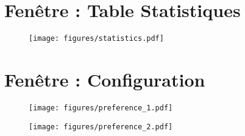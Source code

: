 \begin{appendices}
\section{Fenêtre : Table Statistiques}

\begin{figure}[ht]
	\centering \texttt{[image: figures/statistics.pdf]}
\end{figure}
\clearpage


\section{Fenêtre : Configuration}

\begin{figure}[ht]
	\centering \texttt{[image: figures/preference\_1.pdf]}
\end{figure}
\begin{figure}[ht]
	\centering \texttt{[image: figures/preference\_2.pdf]}
\end{figure}

\end{appendices}
